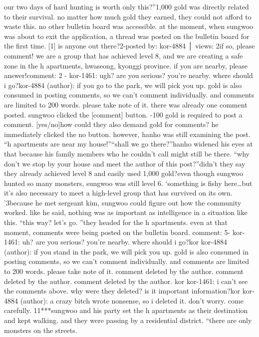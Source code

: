  our two days of hard hunting is worth only this?”1,000 gold was directly related to their survival.
 no matter how much gold they earned, they could not afford to waste this.
no other bulletin board was accessible.
at the moment, when sungwoo was about to exit the application, a thread was posted on the bulletin board for the first time.
[1] is anyone out there?2-posted by: kor-4884 │ views: 2if so, please comment! we are a group that has achieved level 8, and we are creating a safe zone in the h apartments, hwaseong, kyonggi province.
 if you are nearby, please answer!comment: 2
- kor-1461: ugh? are you serious? you’re nearby.
 where should i go?kor-4884 (author): if you go to the park, we will pick you up.
 gold is also consumed in posting comments, so we can’t comment individually.
 and comments are limited to 200 words.
 please take note of it.
there was already one comment posted.
 sungwoo clicked the [comment] button.
-100 gold is required to post a comment.
 [yes/no]how could they also demand gold for comments? he immediately clicked the no button.
however, hanho was still examining the post.
“h apartments are near my house!”“shall we go there?”hanho widened his eyes at that because his family members who he couldn’t call might still be there.
“why don’t we stop by your house and meet the author of this post?”didn’t they say they already achieved level 8 and easily used 1,000 gold?even though sungwoo hunted so many monsters, sungwoo was still level 6.
‘something is fishy here…but it’s also necessary to meet a high-level group that has survived on its own.
’3because he met sergeant kim, sungwoo could figure out how the community worked.
like he said, nothing was as important as intelligence in a situation like this.
“this way? let’s go.
”they headed for the h apartments.
 even at that moment, comments were being posted on the bulletin board.
comment: 5- kor-1461: uh? are you serious? you’re nearby.
 where should i go?kor kor-4884 (author): if you stand in the park, we will pick you up.
 gold is also consumed in posting comments, so we can’t comment individually.
 and comments are limited to 200 words.
 please take note of it.
comment deleted by the author.
comment deleted by the author.
comment deleted by the author.
kor kor-1461: i can’t see the comments above.
 why were they deleted? is it important information?kor kor-4884 (author): a crazy bitch wrote nonsense, so i deleted it.
 don’t worry.
 come carefully.
11***sungwoo and his party set the h apartments as their destination and kept walking.
and they were passing by a residential district.
“there are only monsters on the streets.
